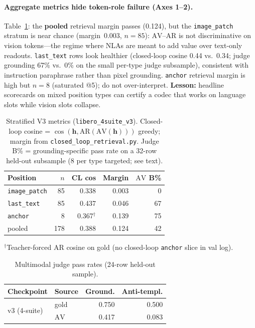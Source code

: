 \documentclass{article}
\newcommand{\AV}{\ensuremath{\mathrm{AV}}}
\newcommand{\AR}{\ensuremath{\mathrm{AR}}}
\newcommand{\hvec}{\mathbf{h}}
\newcommand{\code}[1]{\texttt{\small #1}}
\begin{document}
\paragraph{Aggregate metrics hide token-role failure (Axes 1--2).}
Table~\ref{tab:stratified}: the \textbf{pooled} retrieval margin passes
(0.124), but the \code{image\_patch} stratum is near chance
(margin~0.003, \(n{=}85\)): \(\AV\)--\(\AR\) is not discriminative on
vision tokens---the regime where NLAs are meant to add value over text-only
readouts.
\code{last\_text} rows look healthier (closed-loop cosine 0.44 vs.\ 0.34;
judge grounding 67\% vs.\ 0\% on the small per-type judge subsample),
consistent with instruction paraphrase rather than pixel grounding.
\code{anchor} retrieval margin is high but \(n{=}8\) (saturated @5);
do not over-interpret.
\textbf{Lesson:} headline scorecards on mixed position types can certify a
codec that works on language slots while vision slots collapse.

\begin{table}[t]
  \centering
  \caption{Stratified V3 metrics (\code{libero\_4suite\_v3}). Closed-loop
  cosine = \(\cos(\hvec,\AR(\AV(\hvec)))\) greedy; margin from
  \code{closed\_loop\_retrieval.py}. Judge B\% = grounding-specific pass
  rate on a 32-row held-out subsample (8 per type targeted; see text).}
  \label{tab:stratified}
  \small
  \begin{tabular}{@{}lrrrr@{}}
    \toprule
    Position & \(n\) & CL cos & Margin & \(\AV\) B\% \\
    \midrule
    \code{image\_patch} & 85 & 0.338 & 0.003 & 0 \\
    \code{last\_text}   & 85 & 0.437 & 0.046 & 67 \\
    \code{anchor}       &  8 & 0.367$^\dagger$ & 0.139 & 75 \\
    \midrule
    pooled              & 178 & 0.388 & 0.124 & 42 \\
    \bottomrule
  \end{tabular}
  \vspace{0.25em}
  {\footnotesize $^\dagger$Teacher-forced AR cosine on gold (no closed-loop
  \code{anchor} slice in val log).}
\end{table}

\begin{table}[t]
  \centering
  \caption{Multimodal judge pass rates (24-row held-out sample).}
  \label{tab:judge}
  \small
  \begin{tabular}{@{}llrr@{}}
    \toprule
    Checkpoint & Source & Ground. & Anti-templ. \\
    \midrule
    \multirow{2}{*}{v3 (4-suite)}
      & gold & 0.750 & 0.500 \\
      & \(\AV\) & 0.417 & 0.083 \\
    \bottomrule
  \end{tabular}
\end{table}
\end{document}
